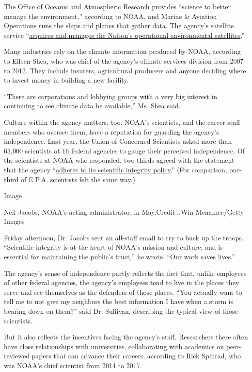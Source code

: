 The Office of Oceanic and Atmospheric Research provides ``science to
better manage the environment,'' according to NOAA, and Marine \&
Aviation Operations runs the ships and planes that gather data. The
agency's satellite service
``\href{https://www.corporateservices.noaa.gov/public/lineoffices.html}{acquires
and manages the Nation's operational environmental satellites}.''

Many industries rely on the climate information produced by NOAA,
according to Eileen Shea, who was chief of the agency's climate services
division from 2007 to 2012. They include insurers, agricultural
producers and anyone deciding where to invest money in building a new
facility.

``There are corporations and lobbying groups with a very big interest in
continuing to see climate data be available,'' Ms. Shea said.

Culture within the agency matters, too. NOAA's scientists, and the
career staff members who oversee them, have a reputation for guarding
the agency's independence. Last year, the Union of Concerned Scientists
asked more than 63,000 scientists at 16 federal agencies to gauge their
perceived independence. Of the scientists at NOAA who responded,
two-thirds agreed with the statement that the agency
``\href{https://www.ucsusa.org/sites/default/files/attach/2018/08/science-under-trump-noaa.pdf}{adheres
to its scientific integrity policy}.'' (For comparison, one-third of
E.P.A. scientists felt the same way.)

Image

Neil Jacobs, NOAA's acting administrator, in May.Credit...Win
Mcnamee/Getty Images

Friday afternoon, Dr. Jacobs sent an all-staff email to try to buck up
the troops. ``Scientific integrity is at the heart of NOAA's mission and
culture, and is essential for maintaining the public's trust,'' he
wrote. ``Our work saves lives.''

The agency's sense of independence partly reflects the fact that, unlike
employees of other federal agencies, the agency's employees tend to live
in the places they serve and see themselves as the defenders of those
places. ``You actually want to tell me to not give my neighbors the best
information I have when a storm is bearing down on them?'' said Dr.
Sullivan, describing the typical view of those scientists.

But it also reflects the incentives facing the agency's staff.
Researchers there often have close relationships with universities,
collaborating with academics on peer-reviewed papers that can advance
their careers, according to Rick Spinrad, who was NOAA's chief scientist
from 2014 to 2017.

